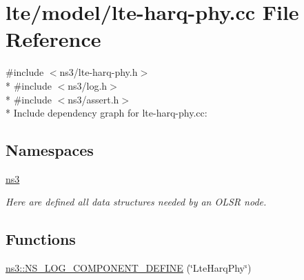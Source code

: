 \hypertarget{lte-harq-phy_8cc}{}\section{lte/model/lte-\/harq-\/phy.cc File Reference}
\label{lte-harq-phy_8cc}
{\ttfamily \#include $<$ns3/lte-\/harq-\/phy.\+h$>$}\\*
{\ttfamily \#include $<$ns3/log.\+h$>$}\\*
{\ttfamily \#include $<$ns3/assert.\+h$>$}\\*
Include dependency graph for lte-\/harq-\/phy.cc\+:
\subsection*{Namespaces}
\begin{DoxyCompactItemize}
\item 
 \hyperlink{namespacens3}{ns3}
\begin{DoxyCompactList}\small\item\em Here are defined all data structures needed by an O\+L\+SR node. \end{DoxyCompactList}\end{DoxyCompactItemize}
\subsection*{Functions}
\begin{DoxyCompactItemize}
\item 
\hyperlink{namespacens3_a0a90252c3c195323924025800a775de0}{ns3\+::\+N\+S\+\_\+\+L\+O\+G\+\_\+\+C\+O\+M\+P\+O\+N\+E\+N\+T\+\_\+\+D\+E\+F\+I\+NE} (\char`\"{}Lte\+Harq\+Phy\char`\"{})
\end{DoxyCompactItemize}
